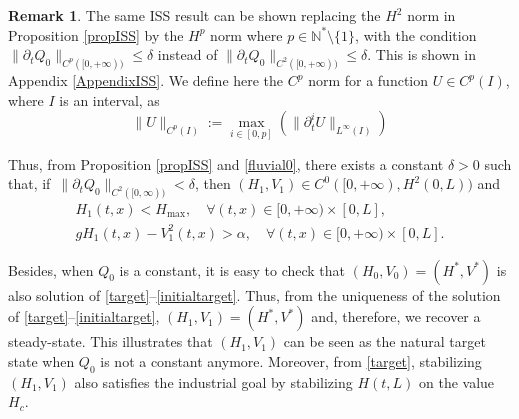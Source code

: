 \documentclass[11pt]{article}
\numberwithin{equation}{section}
\theoremstyle{definition}
\newtheorem{rmk}[thm]{Remark}
\begin{document}
\begin{rmk}
\label{rmkHpISS}
The same ISS result can be shown replacing the $H^{2}$ norm in Proposition \ref{propISS} by the $H^{p}$ norm where ${p\in\mathbb{N}^{*}\setminus\{1\}}$, with the condition $\lVert\partial_{t}Q_{0}\rVert_{C^{p}([0,+\infty))}\leq\delta$ instead of $\lVert\partial_{t}Q_{0}\rVert_{C^{2}([0,+\infty))}\leq\delta$. This is shown in Appendix \ref{AppendixISS}. {We define here the $C^{p}$ norm for a function $U\in C^{p}(I)$, where $I$ is an interval, as
\begin{equation*}
\rVert U \lVert_{C^{p}(I)}:=\max_{i\in[0,p]}(\lVert \partial_{t}^{i}U\rVert_{L^{\infty}(I)})
\end{equation*}}
\end{rmk}

Thus, from Proposition \ref{propISS} and \eqref{fluvial0}, there exists a constant ${\delta}>0$ such that, if~$\lVert\partial_{t}Q_{0}\rVert_{{C^{2}([0,\infty))}}<{\delta}$, then $(H_{1},V_{1})\in C^{0}([0,+\infty),H^{2}(0,L))$ and
\begin{gather}
H_{1}(t,x)<H_{\max},\quad\forall(t,x)\in[0,+\infty)\times[0,L],
\label{Hinfty}\\
gH_{1}(t,x)-V_{1}^{2}(t,x)>\alpha,\quad\forall (t,x)\in[0,+\infty)\times[0,L].
\label{fluvial}
\end{gather}

Besides, when $Q_{0}$ is a constant, it is easy to check that $(H_{0},V_{0})=(H^{*},V^{*})$ is also solution of \eqref{target}--\eqref{initialtarget}. Thus, from the uniqueness of the solution of \eqref{target}--\eqref{initialtarget},
$(H_{1},V_{1})=(H^{*},V^{*})$ and, therefore, we recover a steady-state.
This illustrates that $(H_{1},V_{1})$ can be seen as the natural target state
when $Q_{0}$ is not a constant anymore.
Moreover, from \eqref{target}, stabilizing $(H_{1},V_{1})$ also satisfies the industrial goal by stabilizing $H(t,L)$ on the value $H_{c}$.
\end{document}
